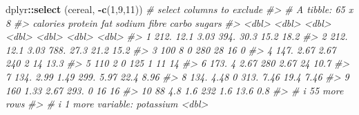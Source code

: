 \documentclass[
]{book}
\newenvironment{Shaded}{\begin{snugshade}}{\end{snugshade}}
\newcommand{\CommentTok}[1]{\textcolor[rgb]{0.56,0.35,0.01}{\textit{#1}}}
\newcommand{\DecValTok}[1]{\textcolor[rgb]{0.00,0.00,0.81}{#1}}
\newcommand{\FunctionTok}[1]{\textcolor[rgb]{0.13,0.29,0.53}{\textbf{#1}}}
\newcommand{\NormalTok}[1]{#1}
\newcommand{\SpecialCharTok}[1]{\textcolor[rgb]{0.81,0.36,0.00}{\textbf{#1}}}
\begin{document}
\begin{Shaded}
\begin{Highlighting}[]
\NormalTok{dplyr}\SpecialCharTok{::}\FunctionTok{select}\NormalTok{ (cereal, }\SpecialCharTok{{-}}\FunctionTok{c}\NormalTok{(}\DecValTok{1}\NormalTok{,}\DecValTok{9}\NormalTok{,}\DecValTok{11}\NormalTok{))      }\CommentTok{\# select columns to exclude}
\CommentTok{\#\textgreater{} \# A tibble: 65 x 8}
\CommentTok{\#\textgreater{}    calories protein   fat sodium fibre carbo sugars}
\CommentTok{\#\textgreater{}       \textless{}dbl\textgreater{}   \textless{}dbl\textgreater{} \textless{}dbl\textgreater{}  \textless{}dbl\textgreater{} \textless{}dbl\textgreater{} \textless{}dbl\textgreater{}  \textless{}dbl\textgreater{}}
\CommentTok{\#\textgreater{}  1     212.   12.1   3.03   394. 30.3   15.2  18.2 }
\CommentTok{\#\textgreater{}  2     212.   12.1   3.03   788. 27.3   21.2  15.2 }
\CommentTok{\#\textgreater{}  3     100     8     0      280  28     16     0   }
\CommentTok{\#\textgreater{}  4     147.    2.67  2.67   240   2     14    13.3 }
\CommentTok{\#\textgreater{}  5     110     2     0      125   1     11    14   }
\CommentTok{\#\textgreater{}  6     173.    4     2.67   280   2.67  24    10.7 }
\CommentTok{\#\textgreater{}  7     134.    2.99  1.49   299.  5.97  22.4   8.96}
\CommentTok{\#\textgreater{}  8     134.    4.48  0      313.  7.46  19.4   7.46}
\CommentTok{\#\textgreater{}  9     160     1.33  2.67   293.  0     16    16   }
\CommentTok{\#\textgreater{} 10      88     4.8   1.6    232   1.6   13.6   0.8 }
\CommentTok{\#\textgreater{} \# i 55 more rows}
\CommentTok{\#\textgreater{} \# i 1 more variable: potassium \textless{}dbl\textgreater{}}


\end{Highlighting}
\end{Shaded}
\end{document}
